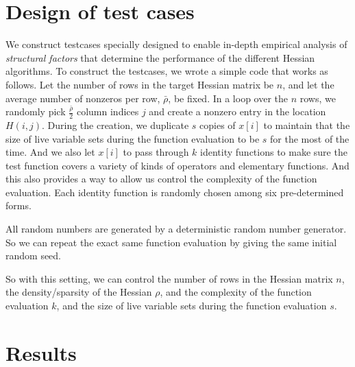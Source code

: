 \documentclass[final,leqno,onefignum,onetabnum]{siamart}
\begin{document}
\section*{Design of test cases}

We construct testcases specially designed to enable in-depth empirical analysis of {\em structural factors} that determine the performance of the  different Hessian algorithms. 
To construct the testcases, we wrote a simple code that works as follows. 
Let the number of rows in the target Hessian matrix be $n$, and let the average number of nonzeros per row, $\bar{\rho}$, be fixed.
In a loop over the $n$ rows, we randomly pick $\frac{\bar{\rho}}{2}$ column indices $j$ and create a nonzero entry in the location $H(i,j)$. During the creation, we duplicate $s$ copies of $x[i]$ to maintain that the size of live variable sets during the function evaluation to be $s$ for the most of the time. And we also let $x[i]$ to pass through $k$ identity functions to make sure the test function covers a variety of kinds of operators and elementary functions. And this also provides a way to allow us control the complexity of the function evaluation. Each identity function is randomly chosen among six pre-determined forms. 

All random numbers are generated by a deterministic random number generator. So we can repeat the exact same function evaluation by giving the same initial random seed.

So with this setting, we can control the number of rows in the Hessian matrix $n$, the density/sparsity of the Hessian $\rho$, and the complexity of the function evaluation $k$, and the size of live variable sets during the function evaluation $s$.

\section*{Results}
\end{document}
